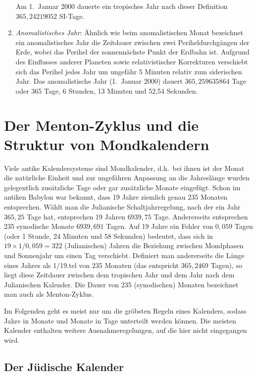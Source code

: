 \begin{enumerate}
Am 1.\ Januar 2000 dauerte ein tropisches Jahr nach dieser Definition $365,24219052$ SI-Tage. 
\item
\textit{Anomalistisches Jahr}:
\"Ahnlich wie beim anomalistischen Monat bezeichnet ein anomalistisches Jahr die Zeitdauer
zwischen zwei Periheldurchg\"angen der Erde, wobei das Perihel der sonnenn\"achste Punkt der
Erdbahn ist. Aufgrund des Einflusses anderer Planeten sowie relativistischer Korrekturen
verschiebt sich das Perihel jedes Jahr um ungef\"ahr 5 Minuten relativ zum siderischen Jahr.
Das anomalistische Jahr (1.\ Januar 2000) dauert $365,259635864$ Tage oder 365 Tage,
6 Stunden, 13 Minuten und 52,54 Sekunden.
\end{enumerate}

\section{Der Menton-Zyklus und die Struktur von Mondkalendern}

Viele antike Kalendersysteme sind 
Mondkalender, d.h.\ bei ihnen ist der Monat die nat\"urliche
Einheit und zur ungef\"ahren Anpassung an die Jahresl\"ange wurden gelegentlich zus\"atzliche Tage oder gar
zus\"atzliche Monate eingef\"ugt. Schon im antiken Babylon war bekannt, dass 19 Jahre ziemlich genau
235 Monaten entsprechen. W\"ahlt man die Julianische Schaltjahrregelung, nach der ein Jahr
$365,25$ Tage hat, entsprechen 19 Jahren $6939,75$ Tage. Andererseits entsprechen 235 synodische
Monate $6939,691$ Tagen. Auf 19 Jahre ein Fehler von $0,059$ Tagen (oder 1 Stunde, 24 Minuten und
58 Sekunden) bedeutet, dass sich in $19 \times 1/0,059 = 322$ 
(Julianischen) Jahren die Beziehung zwischen Mondphasen und Sonnenjahr um einen Tag verschiebt. 
Definiert man andererseits die L\"ange eines Jahres als 1/19.tel von 235 Monaten (das entspricht $365,2469$ Tagen), 
so liegt diese Zeitdauer zwischen dem tropischen Jahr und dem Jahr nach dem 
Julianischen Kalender. 
Die Dauer von 235 (synodischen) Monaten 
bezeichnet man auch als Menton-Zyklus. 

Im Folgenden geht es meist nur um die gr\"obsten Regeln eines Kalenders, sodass Jahre in Monate und Monate in 
Tage unterteilt werden k\"onnen. Die meisten Kalender enthalten weitere Ausnahmeregelungen, auf die hier
nicht eingegangen wird. 

\subsection{Der J\"udische Kalender}

